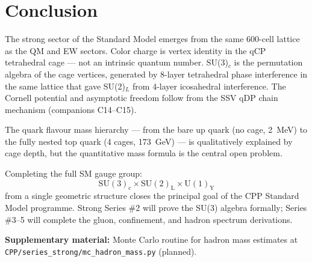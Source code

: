 \documentclass[11pt,a4paper]{article}
\begin{document}
\section{Conclusion}

The strong sector of the Standard Model emerges from the same 600-cell
lattice as the QM and EW sectors.  Color charge is vertex identity
in the qCP tetrahedral cage --- not an intrinsic quantum number.
SU(3)$_c$ is the permutation algebra of the cage vertices,
generated by 8-layer tetrahedral phase interference in the same
lattice that gave SU(2)$_L$ from 4-layer icosahedral interference.
The Cornell potential and asymptotic freedom follow from the SSV
qDP chain mechanism (companions C14--C15).

The quark flavour mass hierarchy --- from the bare up quark (no
cage, 2~MeV) to the fully nested top quark (4 cages, 173~GeV) ---
is qualitatively explained by cage depth, but the quantitative mass
formula is the central open problem.

Completing the full SM gauge group:
\[
\mathrm{SU(3)_c} \times \mathrm{SU(2)_L} \times \mathrm{U(1)_Y}
\]
from a single geometric structure closes the principal goal of the
CPP Standard Model programme.  Strong Series \#2 will prove the
SU(3) algebra formally; Series \#3--5 will complete the gluon,
confinement, and hadron spectrum derivations.

\noindent\textbf{Supplementary material:} Monte Carlo routine for
hadron mass estimates at
\texttt{CPP/series\_strong/mc\_hadron\_mass.py} (planned).
\end{document}

